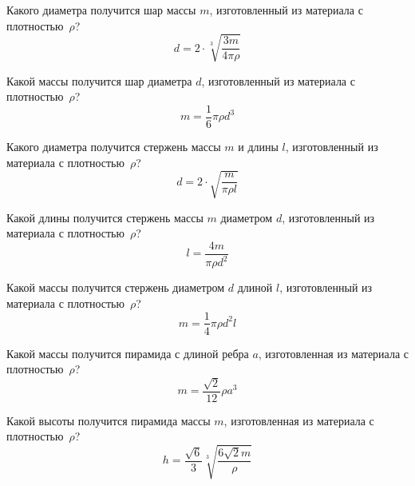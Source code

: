 \begin{zztask}
Какого диаметра получится шар массы $m$, изготовленный из материала с
плотностью~$\rho$?
%
\[
d = 2\cdot \sqrt[3]{\frac{3m}{4\pi\rho}}
\]
\end{zztask}


\begin{zztask}
Какой массы получится шар диаметра $d$, изготовленный из материала с
плотностью~$\rho$?
%
\[
m = \frac{1}{6}\pi\rho d^3
\]
\end{zztask}


\begin{zztask}
Какого диаметра получится стержень массы $m$ и длины $l$, изготовленный из
материала с плотностью~$\rho$?
%
\[
d = 2\cdot \sqrt{\frac{m}{\pi\rho l}}
\]
\end{zztask}


\begin{zztask}
Какой длины получится стержень массы $m$ диаметром $d$, изготовленный из
материала с плотностью~$\rho$?
%
\[
l = \frac{4m}{\pi\rho d^2}
\]
\end{zztask}


\begin{zztask}
Какой массы получится стержень диаметром $d$ длиной $l$, изготовленный из
материала с плотностью~$\rho$?
%
\[
m = \frac{1}{4}\pi\rho d^2 l
\]
\end{zztask}


\begin{zztask}
Какой массы получится пирамида с длиной ребра $a$, изготовленная из
материала с плотностью~$\rho$?
%
\[
m = \frac{\sqrt2}{12}\rho a^3
\]
\end{zztask}


\begin{zztask}
Какой высоты получится пирамида массы $m$, изготовленная из
материала с плотностью~$\rho$?
%
\[
h = \frac{\sqrt6}{3} \sqrt[3]{\frac{6\sqrt2 m}{\rho}}
\]
\end{zztask}

